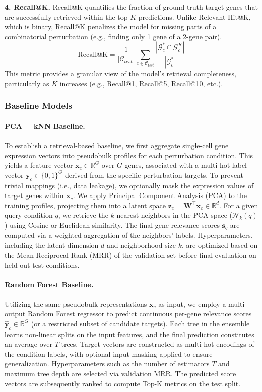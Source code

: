 \documentclass{article}
\begin{document}
\textbf{4. Recall@K.} Recall@K quantifies the fraction of ground-truth target genes that are successfully retrieved within the top-$K$ predictions. Unlike Relevant Hit@K, which is binary, Recall@K penalizes the model for missing parts of a combinatorial perturbation (e.g., finding only 1 gene of a 2-gene pair).
\[
\text{Recall@K} = \frac{1}{|\mathcal{C}_{test}|} \sum_{c \in \mathcal{C}_{test}} \frac{|\mathcal{G}_c^* \cap \mathcal{G}_c^K|}{|\mathcal{G}_c^*|}
\]
This metric provides a granular view of the model's retrieval completeness, particularly as $K$ increases (e.g., Recall@1, Recall@5, Recall@10, etc.).

\subsubsection{Baseline Models}

\paragraph{PCA + kNN Baseline.}
To establish a retrieval-based baseline, we first aggregate single-cell gene expression vectors into pseudobulk profiles for each perturbation condition. This yields a feature vector $\mathbf{x}_c \in \mathbb{R}^G$ over $G$ genes, associated with a multi-hot label vector $\mathbf{y}_c \in \{0,1\}^G$ derived from the specific perturbation targets. To prevent trivial mappings (i.e., data leakage), we optionally mask the expression values of target genes within $\mathbf{x}_c$. We apply Principal Component Analysis (PCA) to the training profiles, projecting them into a latent space $\mathbf{z}_c = \mathbf{W}^\top \mathbf{x}_c \in \mathbb{R}^d$. For a given query condition $q$, we retrieve the $k$ nearest neighbors in the PCA space ($\mathcal{N}_k(q)$) using Cosine or Euclidean similarity. The final gene relevance scores $\mathbf{s}_q$ are computed via a weighted aggregation of the neighbors' labels. Hyperparameters, including the latent dimension $d$ and neighborhood size $k$, are optimized based on the Mean Reciprocal Rank (MRR) of the validation set before final evaluation on held-out test conditions.

\paragraph{Random Forest Baseline.}
Utilizing the same pseudobulk representations $\mathbf{x}_c$ as input, we employ a multi-output Random Forest regressor to predict continuous per-gene relevance scores $\hat{\mathbf{y}}_c \in \mathbb{R}^G$ (or a restricted subset of candidate targets). Each tree in the ensemble learns non-linear splits on the input features, and the final prediction constitutes an average over $T$ trees. Target vectors are constructed as multi-hot encodings of the condition labels, with optional input masking applied to ensure generalization. Hyperparameters such as the number of estimators $T$ and maximum tree depth are selected via validation MRR. The predicted score vectors are subsequently ranked to compute Top-K metrics on the test split.
\end{document}
